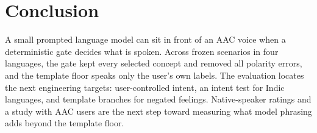 \section{Conclusion}
\label{sec:conclusion}

A small prompted language model can sit in front of an AAC voice when a deterministic gate decides what is spoken.
Across \NPrimAll{} frozen scenarios in four languages, the gate kept every selected concept and removed all polarity errors, and the template floor speaks only the user's own labels.
The evaluation locates the next engineering targets: user-controlled intent, an intent test for Indic languages, and template branches for negated feelings.
Native-speaker ratings and a study with AAC users are the next step toward measuring what model phrasing adds beyond the template floor.
